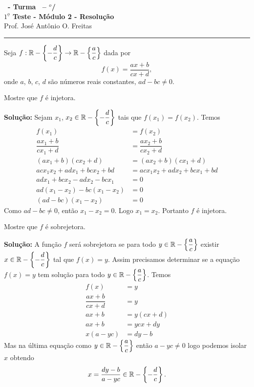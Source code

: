 \documentclass[12pt]{exam}
\begin{document}
\begin{center}
{\Large\bf \disciplina\ - Turma \turma\ -- \semestre$^{o}$/\ano} \\ \vspace{9pt} {\large\bf
$1^{\underline{o}}$ Teste - M\'odulo 2 - Resolu\c{c}\~ao}\\
\vspace{9pt} Prof. Jos{\'e} Ant{\^o}nio O. Freitas
\end{center}
\hrule

\vspace{.6cm}

Seja $f : \mathbb{R} - \left\{-\dfrac{d}{c}\right\} \to \mathbb{R} - \left\{\dfrac{a}{c}\right\}$ dada por
\[
	f(x) =  \dfrac{ax + b}{cx + d},
\]
onde $a$, $b$, $c$, $d$ s{\~a}o n{\'u}meros reais constantes, $ad - bc \ne 0$.
\vspace{.5cm}

\questao Mostre que $f$ \'e injetora.

\noindent\textbf{Solu\c{c}\~ao:} Sejam $x_1$, $x_2 \in \mathbb{R} - \left\{-\dfrac{d}{c}\right\}$ tais que $f(x_1) = f(x_2)$. Temos
\begin{align*}
	f(x_1) &= f(x_2)\\
	\dfrac{ax_1 + b}{cx_1 + d} &= \dfrac{ax_2 + b}{cx_2 + d}\\
	(ax_1 + b)(cx_2 + d) &= (ax_2 + b)(cx_1 + d)\\
	acx_1x_2 + adx_1 + bcx_2 + bd &= acx_1x_2 + adx_2 + bcx_1 + bd\\
	adx_1 + bcx_2 - adx_2 - bcx_1 &= 0\\
	ad(x_1 - x_2) - bc(x_1 - x_2)&= 0\\
	(ad - bc)(x_1 - x_2) &= 0
\end{align*}
Como $ad - bc \ne 0$, ent\~ao $x_1 - x_2 = 0$. Logo $x_1 = x_2$. Portanto $f$ \'e injetora.

\vspace{.5cm}

\questao Mostre que $f$ \'e sobrejetora.

\noindent\textbf{Solu\c{c}\~ao:} A fun\c{c}\~ao $f$ ser\'a sobrejetora se para todo $y \in \mathbb{R} - \left\{\dfrac{a}{c}\right\}$ existir $x \in \mathbb{R} - \left\{-\dfrac{d}{c}\right\}$ tal que $f(x) = y$. Assim precisamos determinar se a equa\c{c}\~ao $f(x) = y$ tem solu\c{c}\~ao para todo $y \in \mathbb{R} - \left\{\dfrac{a}{c}\right\}$.
Temos
\begin{align*}
	f(x) &= y\\
	\dfrac{ax + b}{cx + d} &= y\\
	ax + b &= y(cx + d)\\
	ax + b &= ycx + dy\\
	x(a - yc) &= dy - b
\end{align*}
Mas na \'ultima equa\c{c}\~ao como $y \in \mathbb{R} - \left\{\dfrac{a}{c}\right\}$ ent\~ao $a - yc \ne 0$ logo podemos isolar $x$ obtendo
\[
	x = \dfrac{dy - b}{a - yc} \in \mathbb{R} - \left\{-\dfrac{d}{c}\right\}.
\]
\end{document}

